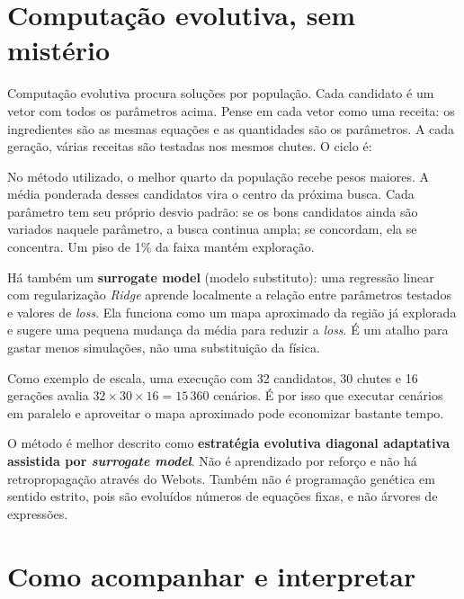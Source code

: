 \documentclass[11pt,a4paper]{article}
\newcommand{\destaque}[1]{\colorbox{cinza}{\parbox{0.94\linewidth}{#1}}}
\newcommand{\termo}[1]{\textbf{\color{azulescuro}#1}}
\begin{document}
\section{Computação evolutiva, sem mistério}

Computação evolutiva procura soluções por população. Cada candidato é um vetor
com todos os parâmetros acima. Pense em cada vetor como uma receita: os
ingredientes são as mesmas equações e as quantidades são os parâmetros. A cada
geração, várias receitas são testadas nos mesmos chutes. O ciclo é:

\begin{center}
\end{center}

No método utilizado, o melhor quarto da população recebe pesos maiores. A média
ponderada desses candidatos vira o centro da próxima busca. Cada parâmetro tem
seu próprio desvio padrão: se os bons candidatos ainda são variados naquele
parâmetro, a busca continua ampla; se concordam, ela se concentra. Um piso de
1\% da faixa mantém exploração.

Há também um \termo{surrogate model} (modelo substituto): uma regressão linear
com regularização \emph{Ridge} aprende localmente a relação entre parâmetros
testados e valores de \emph{loss}.
Ela funciona como um mapa aproximado da região já explorada e sugere uma
pequena mudança da média para reduzir a \emph{loss}. É um atalho
para gastar menos simulações, não uma substituição da física.

Como exemplo de escala, uma execução com 32 candidatos, 30 chutes e 16 gerações
avalia $32\times30\times16=15\,360$ cenários. É por isso que executar cenários
em paralelo e aproveitar o mapa aproximado pode economizar bastante tempo.

\destaque{O método é melhor descrito como \textbf{estratégia evolutiva diagonal
adaptativa assistida por \emph{surrogate model}}. Não é aprendizado por reforço e não
há retropropagação através do Webots. Também não é programação genética em
sentido estrito, pois são evoluídos números de equações fixas, e não árvores de
expressões.}

\section{Como acompanhar e interpretar}
\end{document}
